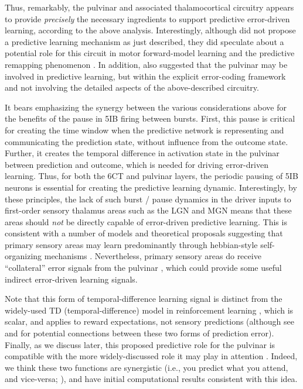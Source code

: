 \documentclass[11pt,twoside]{article}
\newif\myifpdf
\begin{document}
Thus, remarkably, the pulvinar and associated thalamocortical circuitry appears to provide \emph{precisely} the necessary ingredients to support predictive error-driven learning, according to the above analysis.  Interestingly, although \citet{ShermanGuillery06} did not propose a predictive learning mechanism as just described, they did speculate about a potential role for this circuit in motor forward-model learning and the predictive remapping phenomenon \citep{ShermanGuillery11,UsreySherman18}.  In addition, \citet{PennartzDoraMuckliEtAl19} also suggested that the pulvinar may be involved in predictive learning, but within the explicit error-coding framework and not involving the detailed aspects of the above-described circuitry.

It bears emphasizing the synergy between the various considerations above for the benefits of the pause in 5IB firing between bursts.  First, this pause is critical for creating the time window when the predictive network is representing and communicating the prediction state, without influence from the outcome state.  Further, it creates the temporal difference in activation state in the pulvinar between prediction and outcome, which is needed for driving error-driven learning.  Thus, for both the 6CT and pulvinar layers, the periodic pausing of 5IB neurons is essential for creating the predictive learning dynamic.  Interestingly, by these principles, the lack of such burst / pause dynamics in the driver inputs to first-order sensory thalamus areas such as the LGN and MGN \citep{ShermanGuillery06} means that these areas should \emph{not} be directly capable of error-driven predictive learning.  This is consistent with a number of models and theoretical proposals suggesting that primary sensory areas may learn predominantly through hebbian-style self-organizing mechanisms \citep{Miller94,Bednar12}.  Nevertheless,  primary sensory areas do receive ``collateral'' error signals from the pulvinar \citep{Shipp03}, which could provide some useful indirect error-driven learning signals.

Note that this form of temporal-difference learning signal is distinct from the widely-used TD (temporal-difference) model in reinforcement learning \citep{SuttonBarto98}, which is scalar, and applies to reward expectations, not sensory predictions (although see \citealp{GardnerSchoenbaumGershman18} and \citealp{Dayan93} for potential connections between these two forms of prediction error).  Finally, as we discuss later, this proposed predictive role for the pulvinar is compatible with the more widely-discussed role it may play in attention \citep{LaBergeBuchsbaum90,BenderYouakim01,SnowAllenRafalEtAl09,SaalmannKastner11,ZhouSchaferDesimone16,FiebelkornKastner19}.  Indeed, we think these two functions are synergistic (i.e., you predict what you attend, and vice-versa; \citealp{RichterdeLange19}), and have initial computational results consistent with this idea.
\end{document}
